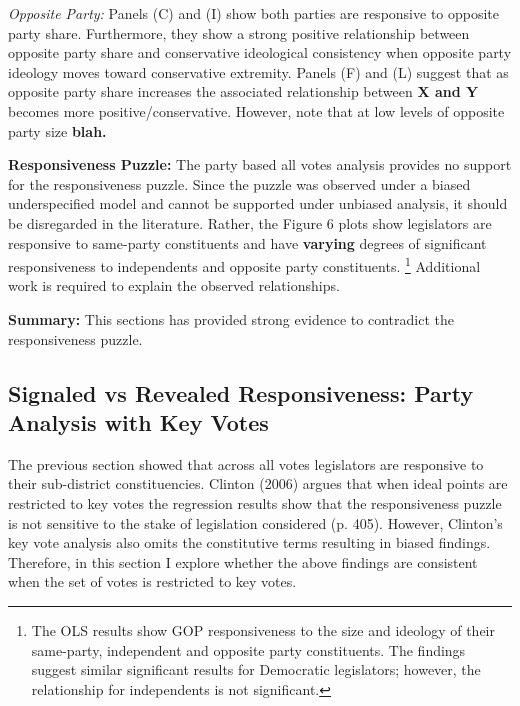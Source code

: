 \documentclass[10pt,letterpaper]{article}
\begin{document}
\textit{Opposite Party:} Panels (C) and (I) show both parties are responsive to opposite party share. Furthermore, they show a strong positive relationship between opposite party share and conservative ideological consistency when opposite party ideology moves toward conservative extremity. Panels (F) and (L) suggest that as opposite party share increases the associated relationship between \textbf{X and Y} becomes more positive/conservative. However, note that at low levels of opposite party size \textbf{blah.}


\textbf{Responsiveness Puzzle:} The party based all votes analysis provides no support for the responsiveness puzzle. Since the puzzle was observed under a biased underspecified model and cannot be supported under unbiased analysis, it should be disregarded in the literature. Rather, the Figure 6 plots show legislators are responsive to same-party constituents and have \textbf{varying} degrees of significant responsiveness to independents and opposite party constituents. \footnote{The OLS results show GOP responsiveness to the size and ideology of their same-party, independent and opposite party constituents. The findings suggest similar significant results for Democratic legislators; however, the relationship for independents is not significant.} Additional work is required to explain the observed relationships.

\textbf{Summary:} This sections has provided strong evidence to contradict the responsiveness puzzle. 



 

\newpage

\subsection{Signaled vs Revealed Responsiveness: Party Analysis with  Key Votes}

The previous section showed that across all votes legislators are responsive to their sub-district constituencies. Clinton (2006) argues that when ideal points are restricted to key votes the regression results show that the responsiveness puzzle is not sensitive to the stake of legislation considered (p. 405). However, Clinton's key vote analysis also omits the constitutive terms resulting in biased findings. Therefore, in this section I explore whether the above findings are consistent when the set of votes is restricted to key votes.
\end{document}
